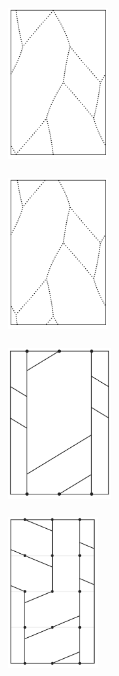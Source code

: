 \documentclass[12pt,twoside]{reedthesis}
\theoremstyle{definition}
\begin{document}
\begin{figure}[p]
  \centering
  \begin{subfigure}[t]{0.24\linewidth}
    \centering
    \includegraphics[height=4cm]{figures/subset_loop_ppqq.pdf}
    \caption{}
  \end{subfigure}
  \hfill
  \begin{subfigure}[t]{0.24\linewidth}
    \centering
    \includegraphics[height=4cm]{figures/subset_loop_ppqq_shifted.pdf}
    \caption{}
  \end{subfigure}
  \hfill
  \begin{subfigure}[t]{0.24\linewidth}
    \centering
    \includegraphics[height=4cm]{figures/subset_loop_ppqq_normalized.pdf}
    \caption{}
  \end{subfigure}
  \hfill
  \begin{subfigure}[t]{0.24\linewidth}
    \centering
    \includegraphics[height=4cm]{figures/subset_loop_ppqq_decomposed.pdf}

\end{subfigure}
\end{figure}
\end{document}
